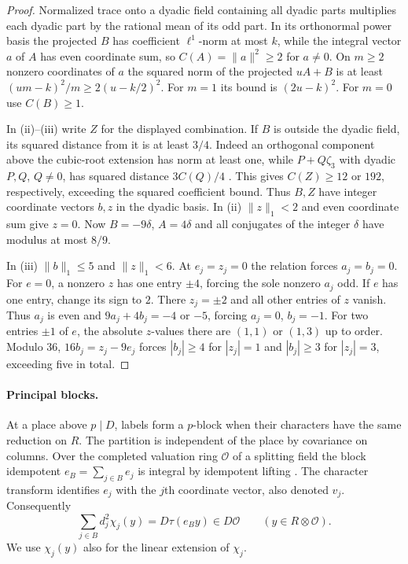 \documentclass[11pt]{amsart}
\numberwithin{equation}{section}
\theoremstyle{definition}
\theoremstyle{plain}
\begin{document}
\begin{proof}
Normalized trace onto a dyadic field containing all dyadic parts
multiplies each dyadic part by the rational mean of its odd part.
In its orthonormal power basis the projected $B$ has coefficient
$\ell^1$-norm at most $k$, while the integral vector $a$ of $A$ has
even coordinate sum, so $C(A)=\|a\|^2\ge2$ for $a\ne0$. On $m\ge2$ nonzero coordinates of $a$ the
squared norm of the projected $uA+B$ is at least
$(um-k)^2/m\ge2(u-k/2)^2$. For $m=1$ its bound is $(2u-k)^2$.
For $m=0$ use $C(B)\ge1$.

In (ii)--(iii) write $Z$ for the displayed combination. If $B$ is
outside the dyadic field, its squared distance from it is at least
$3/4$. Indeed an orthogonal component above the cubic-root extension
has norm at least one, while $P+Q\zeta_3$ with dyadic $P,Q$, $Q\ne0$,
has squared distance $3C(Q)/4$ \cite[Lemma~5.2.1]{CMSCyclotomic}.
This gives $C(Z)\ge12$ or $192$, respectively, exceeding the squared
coefficient bound. Thus $B,Z$ have integer coordinate vectors $b,z$
in the dyadic basis. In (ii) $\|z\|_1<2$ and even coordinate sum
give $z=0$. Now $B=-9\delta$, $A=4\delta$ and all conjugates
of the integer $\delta$ have modulus at most $8/9$.

In (iii) $\|b\|_1\le5$ and $\|z\|_1<6$. At $e_j=z_j=0$ the
relation forces $a_j=b_j=0$. For $e=0$, a nonzero $z$ has one
entry $\pm4$, forcing the sole nonzero $a_j$ odd. If $e$ has
one entry, change its sign to $2$. There $z_j=\pm2$ and all other
entries of $z$ vanish. Thus $a_j$ is even and $9a_j+4b_j=-4$
or $-5$, forcing $a_j=0$, $b_j=-1$. For two entries $\pm1$ of
$e$, the absolute $z$-values there are $(1,1)$ or $(1,3)$ up to order.
Modulo $36$, $16b_j=z_j-9e_j$ forces $|b_j|\ge4$ for $|z_j|=1$
and $|b_j|\ge3$ for $|z_j|=3$, exceeding five in total.
\end{proof}

\paragraph{Principal blocks.}
At a place above $p\mid D$, labels form a $p$-block when their
characters have the same reduction on $R$. The partition is independent
of the place by covariance on columns. Over the completed valuation
ring $\mathcal O$ of a splitting field the block idempotent
$e_B=\sum_{j\in B}e_j$ is integral by idempotent lifting
\cite[Tag 04GH]{Stacks}. The character transform identifies $e_j$ with the $j$th coordinate vector, also denoted $v_j$.
Consequently
\begin{equation}\label{eq:block-trace}
 \sum_{j\in B} d_j^2\chi_j(y)=D\tau(e_By)\in D\mathcal O
 \qquad(y\in R\otimes\mathcal O).
\end{equation}
We use $\chi_j(y)$ also for the linear extension of $\chi_j$.
\end{document}
